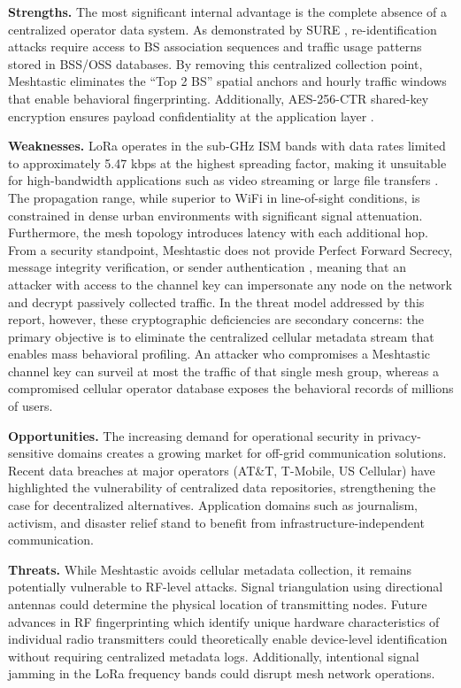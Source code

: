 \textbf{Strengths.} The most significant internal advantage is the complete absence of a centralized operator data system. As demonstrated by SURE \cite{duan2025sure}, re-identification attacks require access to BS association sequences and traffic usage patterns stored in BSS/OSS databases. By removing this centralized collection point, Meshtastic eliminates the ``Top 2 BS'' spatial anchors and hourly traffic windows that enable behavioral fingerprinting. Additionally, AES-256-CTR shared-key encryption ensures payload confidentiality at the application layer \cite{meshtastic_overview}.

\textbf{Weaknesses.} LoRa operates in the sub-GHz ISM bands with data rates limited to approximately 5.47 kbps at the highest spreading factor, making it unsuitable for high-bandwidth applications such as video streaming or large file transfers \cite{meshtastic_overview}. The propagation range, while superior to WiFi in line-of-sight conditions, is constrained in dense urban environments with significant signal attenuation. Furthermore, the mesh topology introduces latency with each additional hop. From a security standpoint, Meshtastic does not provide Perfect Forward Secrecy, message integrity verification, or sender authentication \cite{meshtastic_overview}, meaning that an attacker with access to the channel key can impersonate any node on the network and decrypt passively collected traffic. In the threat model addressed by this report, however, these cryptographic deficiencies are secondary concerns: the primary objective is to eliminate the centralized cellular metadata stream that enables mass behavioral profiling. An attacker who compromises a Meshtastic channel key can surveil at most the traffic of that single mesh group, whereas a compromised cellular operator database exposes the behavioral records of millions of users.

\textbf{Opportunities.} The increasing demand for operational security in privacy-sensitive domains creates a growing market for off-grid communication solutions. Recent data breaches at major operators (AT\&T, T-Mobile, US Cellular) \cite{duan2025sure} have highlighted the vulnerability of centralized data repositories, strengthening the case for decentralized alternatives. Application domains such as journalism, activism, and disaster relief stand to benefit from infrastructure-independent communication.

\textbf{Threats.} While Meshtastic avoids cellular metadata collection, it remains potentially vulnerable to RF-level attacks. Signal triangulation using directional antennas could determine the physical location of transmitting nodes. Future advances in RF fingerprinting which identify unique hardware characteristics of individual radio transmitters could theoretically enable device-level identification without requiring centralized metadata logs. Additionally, intentional signal jamming in the LoRa frequency bands could disrupt mesh network operations.
